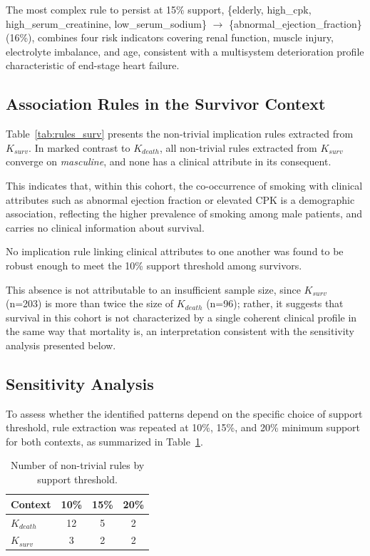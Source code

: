 \documentclass[a4paper,twoside]{article}
\begin{document}
The most complex rule to persist at 15\% support, \{elderly, high\_cpk, high\_serum\_creatinine, low\_serum\_sodium\} $\rightarrow$ \{abnormal\_ejection\_fraction\} (16\%), combines four risk indicators covering renal function, muscle injury, electrolyte imbalance, and age, consistent with a multisystem deterioration profile characteristic of end-stage heart failure.



\subsection{Association Rules in the Survivor Context}

Table~\ref{tab:rules_surv} presents the non-trivial implication rules extracted from $K_{surv}$. In marked contrast to $K_{death}$, all non-trivial rules extracted from $K_{surv}$ converge on \textit{masculine}, and none has a clinical attribute in its consequent.

 

This indicates that, within this cohort, the co-occurrence of smoking with clinical attributes such as abnormal ejection fraction or elevated CPK is a demographic association, reflecting the higher prevalence of smoking among male patients, and carries no clinical information about survival.

No implication rule linking clinical attributes to one another was found to be robust enough to meet the 10\% support threshold among survivors. 

This absence is not attributable to an insufficient sample size, since $K_{surv}$ (n=203) is more than twice the size of $K_{death}$ (n=96); rather, it suggests that survival in this cohort is not characterized by a single coherent clinical profile in the same way that mortality is, an interpretation consistent with the sensitivity analysis presented below.

\subsection{Sensitivity Analysis}

To assess whether the identified patterns depend on the specific choice of support threshold, rule extraction was repeated at 10\%, 15\%, and 20\% minimum support for both contexts, as summarized in Table~\ref{tab:sensitivity}.

\begin{table}[h]
\caption{Number of non-trivial rules by support threshold.}\label{tab:sensitivity}
\centering
{
\begin{tabular}{|l|c|c|c|}
  \hline
  \textbf{Context} & \textbf{10\%} & \textbf{15\%} & \textbf{20\%} \\
  \hline
  $K_{death}$ & 12 & 5 & 2 \\
  $K_{surv}$ & 3 & 2 & 2 \\
  \hline
\end{tabular}}
\end{table}
\end{document}

